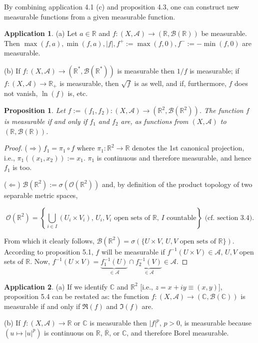 \documentclass[11pt]{article}
\newtheorem{proposition}{Proposition}[section]
\theoremstyle{definition}
\newtheorem{application}{Application}[section]
\begin{document}
By combining application 4.1 (c) and proposition 4.3, one can construct new measurable functions from a given measurable function.

\begin{application}
    (a) Let $a \in \mathbb{R}$ and $f : (X, \mathscr{A}) \to (\mathbb{R}, \mathscr{B}(\mathbb{R}))$ be measurable. Then $\max(f, a), \min(f, a), |f|, f^+ := \max(f, 0), f^- := -\min(f, 0)$ are measurable.
    
    (b) If $f : (X, \mathscr{A}) \to (\mathbb{R}^*, \mathscr{B}(\mathbb{R}^*))$ is measurable then $1/f$ is measurable; if $f : (X, \mathscr{A}) \to \mathbb{R}_+$ is measurable, then $\sqrt{f}$ is as well, and if, furthermore, $f$ does not vanish, $\ln(f)$ is, etc.
\end{application}

\begin{proposition}
    Let $f := (f_1, f_2) : (X, \mathscr{A}) \to (\mathbb{R}^2, \mathscr{B}(\mathbb{R}^2))$. The function $f$ is measurable if and only if $f_1$ and $f_2$ are, as functions from $(X, \mathscr{A})$ to $(\mathbb{R}, \mathscr{B}(\mathbb{R}))$.
\end{proposition}
\begin{proof}
    ($\Rightarrow$) $f_1 = \pi_1 \circ f$ where $\pi_1 : \mathbb{R}^2 \to \mathbb{R}$ denotes the 1st canonical projection, i.e., $\pi_1((x_1, x_2)) := x_1$. $\pi_1$ is continuous and therefore measurable, and hence $f_1$ is too.

($\Leftarrow$) $\mathscr{B}(\mathbb{R}^2) := \sigma(\mathscr{O}(\mathbb{R}^2))$ and, by definition of the product topology of two separable metric spaces,

$$ \mathscr{O}(\mathbb{R}^2) = \left\{ \bigcup_{i \in I} (U_i \times V_i), \, U_i, V_i \text{ open sets of } \mathbb{R}, \, I \text{ countable} \right\} \text{ (cf. section 3.4).} $$

From which it clearly follows, $\mathscr{B}(\mathbb{R}^2) = \sigma(\{U \times V, \, U, V \text{ open sets of } \mathbb{R}\})$. According to proposition 5.1, $f$ will be measurable if $f^{-1}(U \times V) \in \mathscr{A}$, $U, V$ open sets of $\mathbb{R}$. Now, $f^{-1}(U \times V) = \underbrace{f_1^{-1}(U)}_{\in \mathscr{A}} \cap \underbrace{f_2^{-1}(V)}_{\in \mathscr{A}} \in \mathscr{A}$. 
\end{proof}

\begin{application}
    (a) If we identify $\mathbb{C}$ and $\mathbb{R}^2$ [i.e., $z = x + iy \equiv (x, y)$], proposition 5.4 can be restated as: the function $f : (X, \mathscr{A}) \to (\mathbb{C}, \mathscr{B}(\mathbb{C}))$ is measurable if and only if $\Re(f)$ and $\Im(f)$ are.

    (b) If $f : (X, \mathscr{A}) \to \mathbb{R}$ or $\mathbb{C}$ is measurable then $|f|^p$, $p > 0$, is measurable because $(u \mapsto |u|^p)$ is continuous on $\mathbb{R}$, $\overline{\mathbb{R}}$, or $\mathbb{C}$, and therefore Borel measurable.
\end{application}
\end{document}
